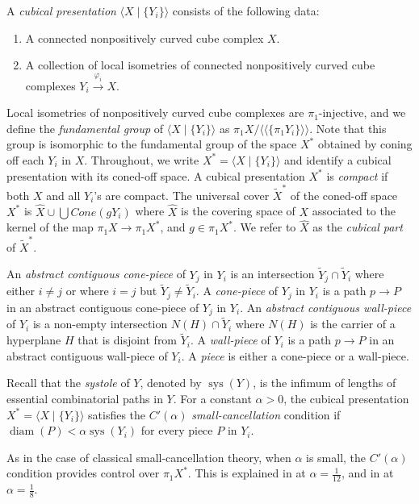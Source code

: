 \documentclass[12pt,oneside]{amsart}
\theoremstyle{definition}
\theoremstyle{definition}
\theoremstyle{remark}
\newcommand{\nclose}[1]{\ensuremath{\langle\!\langle#1\rangle\!\rangle}}
\DeclareMathOperator{\diam}{\text{diam}}
\DeclareMathOperator{\sys}{\mathrm sys}
\begin{document}
A \textit{cubical presentation} $\langle X\mid \{Y_i\} \rangle$ consists of the following data:
\begin{enumerate}
    \item A connected nonpositively curved cube complex $X$. 
    \item  A collection of local isometries of connected nonpositively curved cube complexes $Y_i \overset{\varphi_i} \longrightarrow X$.
\end{enumerate} Local isometries of nonpositively curved cube complexes are $\pi_1$-injective, and we define the \emph{fundamental group} of $\langle X\mid \{Y_i\} \rangle$ as $\pi_1 X/\nclose{\{\pi_1 Y_i\}}$. Note that this group is isomorphic to the fundamental group of the space $X^*$ obtained by coning off each $Y_i$ in $X$. Throughout, we write $X^*=\langle X\mid \{Y_i\} \rangle$ and identify a cubical presentation with its coned-off space.
A cubical presentation $X^*$ is \emph{compact} if both $X$ and all $Y_i$'s are compact. The universal cover $\widetilde X^*$ of the coned-off space $X^*$ is $\hat X\cup \bigcup Cone(gY_i)$ where $\hat X$ is the covering space of $X$ associated to the kernel of the map $\pi_1 X \rightarrow \pi_1X^*$, and $g\in \pi_1 X^*$. We refer to $\hat X$ as the \emph{cubical part} of $\widetilde X^*$.


An \emph{abstract contiguous cone-piece} of $Y_j$ in $Y_i$ is an intersection $\widetilde{Y}_j \cap \widetilde{Y}_i$ where either $i \neq j$ or where $i = j$
but $\widetilde{Y}_j \neq \widetilde{Y}_i$. A \emph{cone-piece} of $Y_j$ in $Y_i$ is a path $p \rightarrow P$ in an abstract contiguous cone-piece of $Y_j$ in $Y_i$.
An \emph{abstract contiguous wall-piece} of $Y_i$ is a non-empty intersection $N(H) \cap \widetilde{Y}_i$ where $N(H)$ is
the carrier of a hyperplane $H$ that is disjoint from $\widetilde{Y}_i$. A \emph{wall-piece} of $Y_i$ is a path $p \rightarrow P$ in an abstract contiguous wall-piece of $Y_i$.
%
A \emph{piece} is either a cone-piece or a wall-piece.

Recall that the \emph{systole} of $Y$, denoted by $\sys(Y)$, is the infimum of lengths of  essential combinatorial paths in $Y$.
For a constant $\alpha > 0$, the cubical presentation $X^*=\langle X \mid \{Y_i\} \rangle$ satisfies the $C'(\alpha)$ \emph{small-cancellation} condition if
$\diam (P) < \alpha \sys(Y_i)$
for every piece $P$ in $Y_i$.

As in the case of classical small-cancellation theory, when $\alpha$ is small, the $C'(\alpha)$ condition provides control over $\pi_1X^*$. This is explained in \cite{WiseBook} at $\alpha=\frac1{12}$, and in \cite{Jankiewicz2017} at $\alpha=\frac18$.
\end{document}
